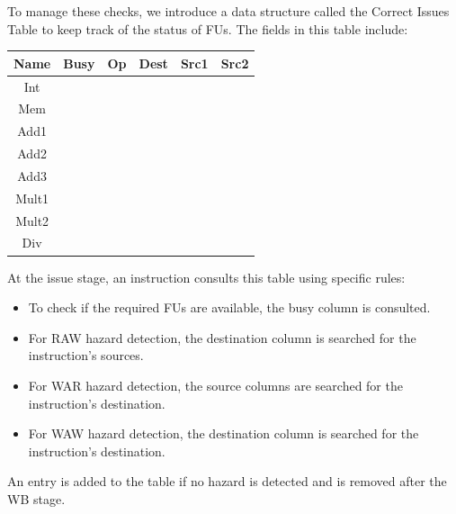 To manage these checks, we introduce a data structure called the Correct Issues Table to keep track of the status of FUs. 
The fields in this table include:
\begin{table}[H]
    \centering
    \begin{tabular}{|c|c|cccc|}
        \hline
    \textbf{Name} & \textbf{Busy} & \textbf{Op} & \textbf{Dest} & \textbf{Src1} & \textbf{Src2} \\ \hline
    Int           &               &             &               &               &               \\
    Mem           &               &             &               &               &               \\ \hline
    Add1          &               &             &               &               &               \\
    Add2          &               &             &               &               &               \\
    Add3          &               &             &               &               &               \\ \hline
    Mult1         &               &             &               &               &               \\
    Mult2         &               &             &               &               &               \\ \hline
    Div           &               &             &               &               &               \\ \hline
    \end{tabular}
\end{table}
At the issue stage, an instruction consults this table using specific rules:
\begin{itemize}
    \item To check if the required FUs are available, the busy column is consulted.
    \item For RAW hazard detection, the destination column is searched for the instruction's sources.
    \item For WAR hazard detection, the source columns are searched for the instruction's destination.
    \item For WAW hazard detection, the destination column is searched for the instruction's destination.
\end{itemize}
An entry is added to the table if no hazard is detected and is removed after the WB stage.

